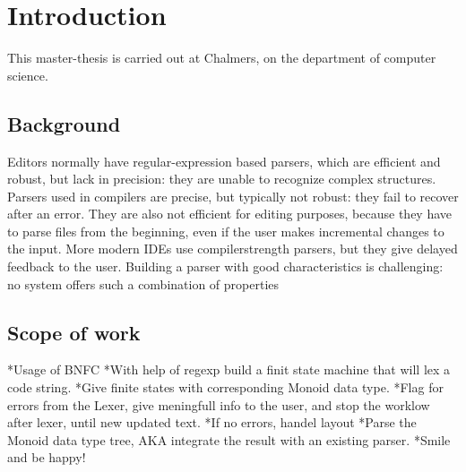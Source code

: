 \chapter{Introduction}
This master-thesis is carried out at Chalmers, on the department of computer science. 

\section{Background}
Editors normally have regular-expression based parsers, which are efficient and robust,
but lack in precision: they are unable to recognize complex structures. Parsers used in
compilers are precise, but typically not robust: they fail to recover after an error. They are
also not efficient for editing purposes, because they have to parse files from the beginning,
even if the user makes incremental changes to the input. More modern IDEs use compilerstrength
parsers, but they give delayed feedback to the user. Building a parser with good
characteristics is challenging: no system offers such a combination of properties

\section{Scope of work}
*Usage of BNFC
*With help of regexp build a finit state machine that will lex a code string.
*Give finite states with corresponding Monoid data type.
*Flag for errors from the Lexer, give meningfull info to the user, and stop 
    the worklow after lexer, until new updated text.
*If no errors, handel layout
*Parse the Monoid data type tree, 
    AKA integrate the result with an existing parser.
*Smile and be happy!

 
